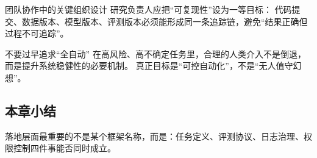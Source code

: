 \begin{knowledgebox}{团队协作中的关键组织设计}
研究负责人应把“可复现性”设为一等目标：  
代码提交、数据版本、模型版本、评测版本必须能形成同一条追踪链，避免“结果正确但过程不可追踪”。
\end{knowledgebox}

\begin{warningbox}{不要过早追求“全自动”}
在高风险、高不确定任务里，合理的人类介入不是倒退，而是提升系统稳健性的必要机制。  
真正目标是“可控自动化”，不是“无人值守幻想”。
\end{warningbox}

\subsection{本章小结}
落地层面最重要的不是某个框架名称，而是：任务定义、评测协议、日志治理、权限控制四件事能否同时成立。


